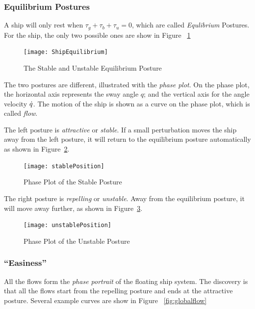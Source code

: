 \subsubsection*{Equilibrium Postures}
A ship will only rest when $\tau_{g}+\tau_{b}+\tau_{u}=0$, which are called \emph{Equlibrium} Postures.
For the ship, the only two possible ones are show in Figure ~\ref{fig:ShipEqulibrium}
\begin{figure}[!htbp]
  \begin{center}
     \texttt{[image: ShipEquilibrium]}
    \caption{The Stable and Unstable Equilibrium Posture}
    \label{fig:ShipEqulibrium}
  \end{center}
\end{figure}



The two postures are different, illustrated with the \emph{phase plot}.
On the phase plot, the horizontal axis represents the sway angle $q$; and the vertical axis for the angle velocity $\dot{q}$. 
The motion of the ship is shown as a curve on the phase plot, which is called \emph{flow}.

The left posture is \emph{attractive} or \emph{stable}.
If a small perturbation moves the ship away from the left posture, it will return to the equilibrium posture automatically as shown in Figure~\ref{fig:StablePosture}.
\begin{figure}[!htbp]
  \begin{center}
      \texttt{[image: stablePosition]}
    \caption{Phase Plot of the Stable Posture}
    \label{fig:StablePosture}
  \end{center}
\end{figure}


The right posture is \emph{repelling} or \emph{unstable}.
Away from the equilibrium posture, it will move away further, as shown in Figure~\ref{fig:unStablePosture}.

\begin{figure}[!htbp]
  \begin{center}
      \texttt{[image: unstablePosition]}
    \caption{Phase Plot of the Unstable Posture}
    \label{fig:unStablePosture}
  \end{center}
\end{figure}


\subsubsection*{``Easiness''}
All the flows form the \emph{phase portrait} of the floating ship system. 
The discovery is that all the flows start from the repelling posture and ends at the attractive posture.
Several example curves are show in Figure ~\ref{fig:globalflow}

